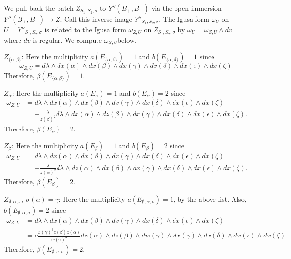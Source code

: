 \documentclass[12pt,letterpaper]{amsart}
\begin{document}
We pull-back the patch $Z_{S_1,S_2,\sigma}$
to $Y''(B_+,B_-)$ via the open immersion
$Y''(B_+,B_-)\rightarrow Z$. Call this inverse image $Y''_{S_1,S_2,\sigma}$.
The Igusa form $\omega_U$ on $U=Y''_{S_1,S_2,\sigma}$ is related to the
Igusa form $\omega_{Z,U}$ on $Z_{S_1,S_2,\sigma}$ by
$\omega_U=\omega_{Z,U}\wedge dv$,
where $dv$ is regular. We compute $\omega_{Z,U}$below.

$Z_{\{\alpha,\beta\}}$: Here the multiplicity $a(E_{\{\alpha,\beta\}})=1$
and $b(E_{\{\alpha,\beta\}})=1$ since
\[
\omega_{Z,U}
=d\lambda\wedge dx(\alpha)\wedge dx(\beta)\wedge dx(\gamma)
\wedge dx(\delta)\wedge dx(\epsilon)\wedge dx(\zeta) .
\]
Therefore, $\beta(E_{\{\alpha,\beta\}})=1$.

\medskip
$Z_{\alpha}$: Here the multiplicity $a(E_{\alpha})=1$
and $b(E_{\alpha})=2$ since
\[
\begin{split}
\omega_{Z,U}
&=d\lambda\wedge dx(\alpha)\wedge dx(\beta)\wedge dx(\gamma)
\wedge dx(\delta)\wedge dx(\epsilon)\wedge dx(\zeta)\\
&=-\frac{\lambda}{z(\beta)^2}
d\lambda\wedge dx(\alpha)\wedge dz(\beta)\wedge dx(\gamma)
\wedge dx(\delta)\wedge dx(\epsilon)\wedge dx(\zeta).
\end{split}
\]
Therefore, $\beta(E_{\alpha})=2$.

\medskip
$Z_{\beta}$: Here the multiplicity $a(E_{\beta})=1$
and $b(E_{\beta})=2$ since
\[
\begin{split}
\omega_{Z,U}
&=d\lambda\wedge dx(\alpha)\wedge dx(\beta)\wedge dx(\gamma)
\wedge dx(\delta)\wedge dx(\epsilon)\wedge dx(\zeta)\\
&=-\frac{\lambda}{z(\alpha)^2}
d\lambda\wedge dz(\alpha)\wedge dx(\beta)\wedge dx(\gamma)
\wedge dx(\delta)\wedge dx(\epsilon)\wedge dx(\zeta).
\end{split}
\]
Therefore, $\beta(E_{\beta})=2$.

\medskip
$Z_{\emptyset,\alpha,\sigma}, \ \sigma(\alpha)=\gamma$:
Here the multiplicity $a(E_{\emptyset,\alpha,\sigma})=1$, by the
above list. Also, $b(E_{\emptyset,\alpha,\sigma})=2$ since
\[
\begin{split}
\omega_{Z,U}
&=d\lambda\wedge dx(\alpha)\wedge dx(\beta)\wedge dx(\gamma)
\wedge dx(\delta)\wedge dx(\epsilon)\wedge dx(\zeta)\\
&=c\frac{x(\gamma)^3z(\beta)z(\alpha)}{w(\gamma)^4}
dz(\alpha)\wedge dz(\beta)\wedge dw(\gamma)\wedge dx(\gamma)
\wedge dx(\delta)\wedge dx(\epsilon)\wedge dx(\zeta).
\end{split}
\]
Therefore, $\beta(E_{\emptyset,\alpha,\sigma})=2$.
\end{document}

